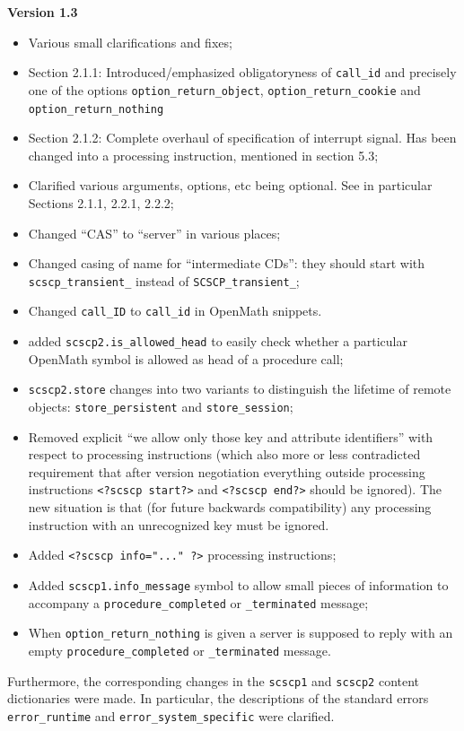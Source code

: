\documentclass{amsart}
\begin{document}
{\bf Version 1.3}
\begin{itemize}
\item Various small clarifications and fixes;
\item Section 2.1.1: Introduced/emphasized obligatoryness of \texttt{call\_id} and precisely one of the options
\texttt{option\_return\_object}, \texttt{option\_return\_cookie} and \texttt{option\_return\_nothing}
\item Section 2.1.2: Complete overhaul of specification of interrupt signal. Has been changed into a processing instruction, mentioned in section 5.3;
\item Clarified various arguments, options, etc being optional. See in particular Sections 2.1.1, 2.2.1, 2.2.2;
\item Changed ``CAS'' to ``server'' in various places;
\item Changed casing of name for ``intermediate CDs'': they should start with \texttt{scscp\_transient\_} instead of \texttt{SCSCP\_transient\_};
\item Changed \texttt{call\_ID} to \texttt{call\_id} in OpenMath snippets.
\item added \texttt{scscp2.is\_allowed\_head} to easily check whether a particular OpenMath symbol is allowed as head of a procedure call; 
\item \texttt{scscp2.store} changes into two variants to distinguish the lifetime
of remote objects: \texttt{store\_persistent} and \texttt{store\_session};
\item Removed explicit ``we allow only those key and attribute identifiers'' with respect to processing instructions (which also more or less contradicted requirement that after version negotiation everything outside processing instructions \texttt{<?scscp start?>} and \texttt{<?scscp end?>} should be ignored). The new situation is that (for future backwards compatibility) any processing instruction with an unrecognized key must be ignored.
\item Added \texttt{<?scscp info="..." ?>} processing instructions;
\item Added \texttt{scscp1.info\_message} symbol to allow small pieces of information to accompany a \texttt{procedure\_completed} or \texttt{\_terminated} message;
\item When \texttt{option\_return\_nothing} is given a server is supposed to reply with an empty \texttt{procedure\_completed} or \texttt{\_terminated} message.
\end{itemize}
Furthermore, the corresponding changes in the \texttt{scscp1} and \texttt{scscp2} content dictionaries were made. In particular, the descriptions of the standard errors \texttt{error\_runtime} and \texttt{error\_system\_specific} were clarified.
\end{document}
